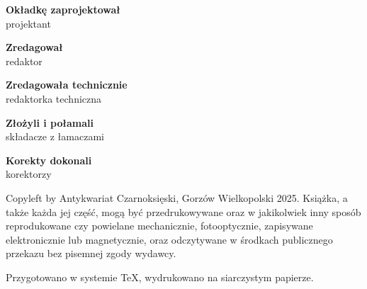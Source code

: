 

\thispagestyle{empty}

{\noindent \textbf{Okładkę zaprojektował}\\projektant}
\vspace{5mm}

{\noindent \textbf{Zredagował}\\redaktor}
\vspace{5mm}

{\noindent \textbf{Zredagowała technicznie}\\redaktorka techniczna}
\vspace{5mm}

{\noindent \textbf{Złożyli i połamali}\\składacze z łamaczami}
\vspace{5mm}

{\noindent \textbf{Korekty dokonali}\\korektorzy}

\vfill

{\noindent Copyleft by Antykwariat Czarnoksięski, Gorzów Wielkopolski 2025.
Książka, a także każda jej część, mogą być przedrukowywane oraz w jakikolwiek inny sposób reprodukowane czy powielane mechanicznie, fotooptycznie, zapisywane elektronicznie lub magnetycznie, oraz odczytywane w środkach publicznego przekazu bez pisemnej zgody wydawcy.}

\vspace{5mm}

{\noindent Przygotowano w systemie \TeX, wydrukowano na siarczystym papierze.}


